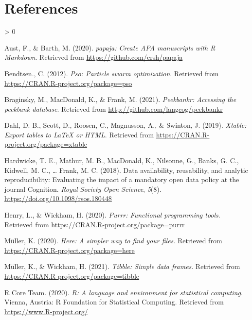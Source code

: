 \documentclass[
  english,
  man,floatsintext]{apa6}
\newlength{\cslhangindent}
\newenvironment{CSLReferences}[2] %
 {%
  \setlength{\parindent}{0pt}
  \ifodd #1 \everypar{\setlength{\hangindent}{\cslhangindent}}\ignorespaces\fi
  \ifnum #2 > 0
  \setlength{\parskip}{#2\baselineskip}
  \fi
 }%
 {}
\begin{document}
\newpage

\hypertarget{references}{%
\section{References}\label{references}}

\begingroup
\setlength{\parindent}{-0.5in}
\setlength{\leftskip}{0.5in}

\hypertarget{refs}{}
\begin{CSLReferences}{1}{0}
\leavevmode\hypertarget{ref-R-papaja}{}%
Aust, F., \& Barth, M. (2020). \emph{{papaja}: {Create} {APA} manuscripts with {R Markdown}}. Retrieved from \url{https://github.com/crsh/papaja}

\leavevmode\hypertarget{ref-R-pso}{}%
Bendtsen., C. (2012). \emph{Pso: Particle swarm optimization}. Retrieved from \url{https://CRAN.R-project.org/package=pso}

\leavevmode\hypertarget{ref-R-peekbankr}{}%
Braginsky, M., MacDonald, K., \& Frank, M. (2021). \emph{Peekbankr: Accessing the peekbank database}. Retrieved from \url{http://github.com/langcog/peekbankr}

\leavevmode\hypertarget{ref-R-xtable}{}%
Dahl, D. B., Scott, D., Roosen, C., Magnusson, A., \& Swinton, J. (2019). \emph{Xtable: Export tables to LaTeX or HTML}. Retrieved from \url{https://CRAN.R-project.org/package=xtable}

\leavevmode\hypertarget{ref-Hardwicke2018}{}%
Hardwicke, T. E., Mathur, M. B., MacDonald, K., Nilsonne, G., Banks, G. C., Kidwell, M. C., \ldots{} Frank, M. C. (2018). {Data availability, reusability, and analytic reproducibility: Evaluating the impact of a mandatory open data policy at the journal Cognition}. \emph{Royal Society Open Science}, \emph{5}(8). \url{https://doi.org/10.1098/rsos.180448}

\leavevmode\hypertarget{ref-R-purrr}{}%
Henry, L., \& Wickham, H. (2020). \emph{Purrr: Functional programming tools}. Retrieved from \url{https://CRAN.R-project.org/package=purrr}

\leavevmode\hypertarget{ref-R-here}{}%
Müller, K. (2020). \emph{Here: A simpler way to find your files}. Retrieved from \url{https://CRAN.R-project.org/package=here}

\leavevmode\hypertarget{ref-R-tibble}{}%
Müller, K., \& Wickham, H. (2021). \emph{Tibble: Simple data frames}. Retrieved from \url{https://CRAN.R-project.org/package=tibble}

\leavevmode\hypertarget{ref-R-base}{}%
R Core Team. (2020). \emph{R: A language and environment for statistical computing}. Vienna, Austria: R Foundation for Statistical Computing. Retrieved from \url{https://www.R-project.org/}


\end{CSLReferences}
\end{document}
